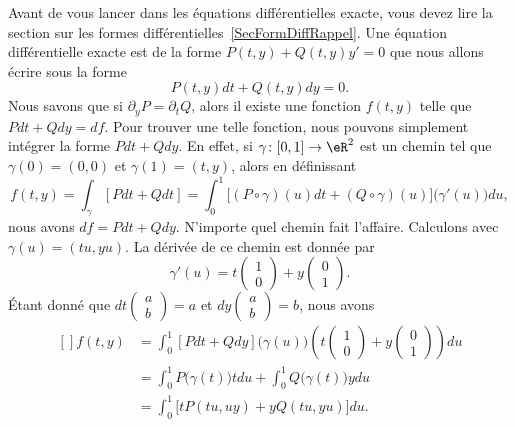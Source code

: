 Avant de vous lancer dans les équations différentielles exacte, vous devez lire la section sur les formes différentielles~\ref{SecFormDiffRappel}. Une équation différentielle exacte est de la forme $P(t,y)+Q(t,y)y'=0$ que nous allons écrire sous la forme
\begin{equation}		\label{EqExacteDiff}
	P(t,y)dt+Q(t,y)dy=0.
\end{equation}
Nous savons que si $\partial_yP=\partial_tQ$, alors il existe une fonction $f(t,y)$ telle que $Pdt+Qdy=df$. Pour trouver une telle fonction, nous pouvons simplement intégrer la forme $Pdt+Qdy$. En effet, si $\gamma\colon [0,1]\to \eR^2$ est un chemin tel que $\gamma(0)=(0,0)$ et $\gamma(1)=(t,y)$, alors en définissant
\begin{equation}
	f(t,y)=\int_{\gamma}[Pdt+Qdt]=\int_{0}^1\big[ (P\circ\gamma)(u)dt+(Q\circ\gamma)(u) \big]\big( \gamma'(u) \big)du,
\end{equation}
nous avons $df=Pdt+Qdy$. N'importe quel chemin fait l'affaire. Calculons avec $\gamma(u)=(tu,yu)$. La dérivée de ce chemin est donnée par
\begin{equation}
	\gamma'(u)=t\begin{pmatrix}
	1	\\
	0
\end{pmatrix}+y\begin{pmatrix}
	0	\\
	1
\end{pmatrix}.
\end{equation}
Étant donné que $dt\begin{pmatrix}
	a	\\
	b
\end{pmatrix}=a$ et $dy\begin{pmatrix}
	a	\\
	b
\end{pmatrix}=b$, nous avons
\begin{equation}
	\begin{aligned}[]
	f(t,y)&=\int_0^1[Pdt+Qdy]\big( \gamma(u) \big)\left( t\begin{pmatrix}
	1	\\
	0
\end{pmatrix}+y\begin{pmatrix}
	0	\\
	1
\end{pmatrix} \right)du\\
		&=\int_0^1P\big( \gamma(t) \big)tdu+\int_0^1Q\big( \gamma(t) \big)ydu\\
		&=\int_0^1\big[ tP(tu,uy)+yQ(tu,yu) \big]du.
	\end{aligned}
\end{equation}
